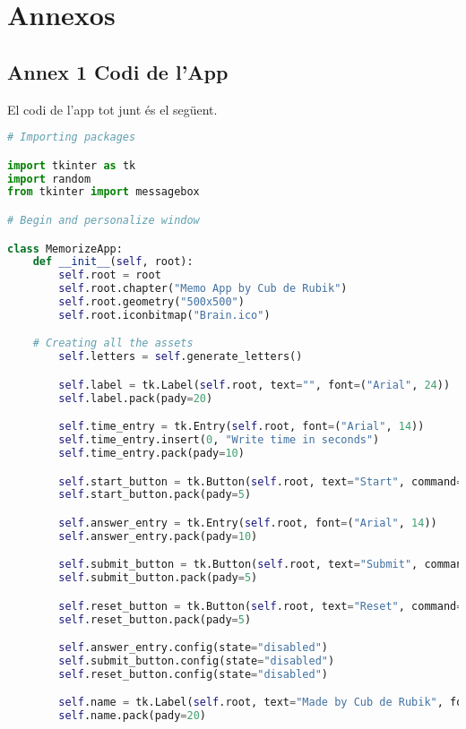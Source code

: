 \part{Annexos}
\pagestyle{annex1}
\chapter{Annex 1 Codi de l'App}

El codi de l'app tot junt és el següent.

\begin{lstlisting}[language=Python, style=colorEX, caption=Codi sencer de l'App]
    # Importing packages

import tkinter as tk
import random
from tkinter import messagebox

# Begin and personalize window

class MemorizeApp:
    def __init__(self, root):
        self.root = root
        self.root.chapter("Memo App by Cub de Rubik")
        self.root.geometry("500x500")
        self.root.iconbitmap("Brain.ico")

    # Creating all the assets
        self.letters = self.generate_letters()

        self.label = tk.Label(self.root, text="", font=("Arial", 24))
        self.label.pack(pady=20)

        self.time_entry = tk.Entry(self.root, font=("Arial", 14))
        self.time_entry.insert(0, "Write time in seconds")
        self.time_entry.pack(pady=10)

        self.start_button = tk.Button(self.root, text="Start", command=self.start_memorize)
        self.start_button.pack(pady=5)

        self.answer_entry = tk.Entry(self.root, font=("Arial", 14))
        self.answer_entry.pack(pady=10)

        self.submit_button = tk.Button(self.root, text="Submit", command=self.check_answers)
        self.submit_button.pack(pady=5)

        self.reset_button = tk.Button(self.root, text="Reset", command=self.reset)
        self.reset_button.pack(pady=5)

        self.answer_entry.config(state="disabled")
        self.submit_button.config(state="disabled")
        self.reset_button.config(state="disabled")

        self.name = tk.Label(self.root, text="Made by Cub de Rubik", font=("Arial", 8))
        self.name.pack(pady=20)


\end{lstlisting}
